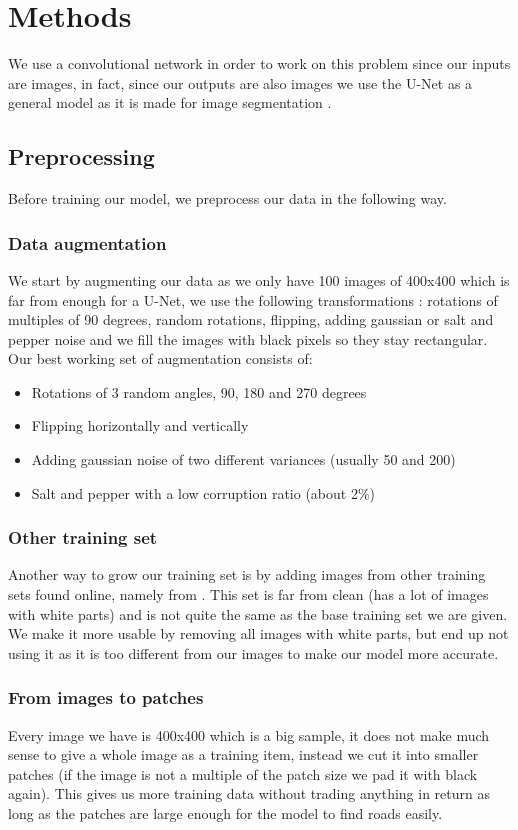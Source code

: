 \documentclass[10pt,conference,compsocconf]{IEEEtran}
\begin{document}
\section{Methods}
We use a convolutional network in order to work on this problem since our inputs are images, in fact, since our outputs are also images we use the U-Net as a general model as it is made for image segmentation \cite{wiki:u-net}.
\subsection{Preprocessing}
\label{preprocess}
Before training our model, we preprocess our data in the following way.
\subsubsection{Data augmentation}
We start by augmenting our data as we only have 100 images of 400x400 which is far from enough for a U-Net, we use the following transformations : rotations of multiples of 90 degrees, random rotations, flipping, adding gaussian or salt and pepper noise and we fill the images with black pixels so they stay rectangular. Our best working set of augmentation consists of:
\begin{itemize}
\item Rotations of 3 random angles, 90, 180 and 270 degrees
\item Flipping horizontally and vertically
\item Adding gaussian noise of two different variances (usually 50 and 200)
\item Salt and pepper with a low corruption ratio (about 2\%)
\end{itemize}
\subsubsection{Other training set}
\label{otherset}
Another way to grow our training set is by adding images from other training sets found online, namely from \cite{newtraining}. This set is far from clean (has a lot of images with white parts) and is not quite the same as the base training set we are given. We make it more usable by removing all images with white parts, but end up not using it as it is too different from our images to make our model more accurate.
\subsubsection{From images to patches}
Every image we have is 400x400 which is a big sample, it does not make much sense to give a whole image as a training item, instead we cut it into smaller patches (if the image is not a multiple of the patch size we pad it with black again). This gives us more training data without trading anything in return as long as the patches are large enough for the model to find roads easily.
\end{document}
